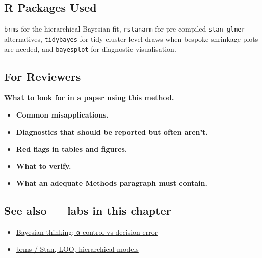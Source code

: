\documentclass[
]{article}
\providecommand{\tightlist}{%
  \setlength{\itemsep}{0pt}\setlength{\parskip}{0pt}}
\begin{document}
\subsection{R Packages Used}\label{r-packages-used}

\texttt{brms} for the hierarchical Bayesian fit, \texttt{rstanarm} for
pre-compiled \texttt{stan\_glmer} alternatives, \texttt{tidybayes} for
tidy cluster-level draws when bespoke shrinkage plots are needed, and
\texttt{bayesplot} for diagnostic visualisation.

\subsection{For Reviewers}\label{for-reviewers}

\textbf{What to look for in a paper using this method.}

\begin{itemize}
\tightlist
\item
  \textbf{Common misapplications.}
\item
  \textbf{Diagnostics that should be reported but often aren't.}
\item
  \textbf{Red flags in tables and figures.}
\item
  \textbf{What to verify.}
\item
  \textbf{What an adequate Methods paragraph must contain.}
\end{itemize}

\subsection{See also --- labs in this
chapter}\label{see-also-labs-in-this-chapter}

\begin{itemize}
\tightlist
\item
  \href{labs/lab-bayesian-thinking-control-vs-decision-error.Rmd}{Bayesian
  thinking; α control vs decision error}
\item
  \href{labs/lab-brms-stan-loo-hierarchical-models.Rmd}{brms / Stan,
  LOO, hierarchical models}
\end{itemize}
\end{document}
